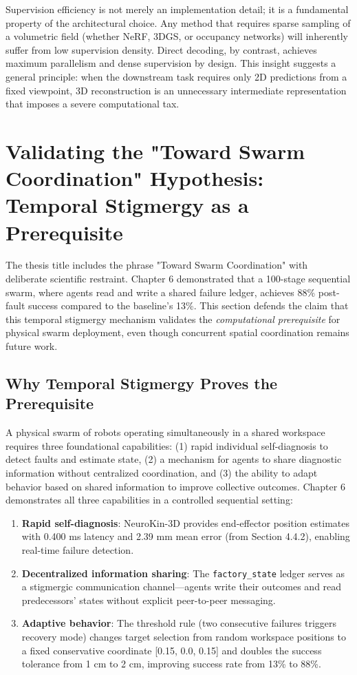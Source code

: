 ﻿\documentclass[12pt,a4paper,oneside]{report}
\begin{document}
Supervision efficiency is not merely an implementation detail; it is a fundamental property of the architectural choice. Any method that requires sparse sampling of a volumetric field (whether NeRF, 3DGS, or occupancy networks) will inherently suffer from low supervision density. Direct decoding, by contrast, achieves maximum parallelism and dense supervision by design. This insight suggests a general principle: when the downstream task requires only 2D predictions from a fixed viewpoint, 3D reconstruction is an unnecessary intermediate representation that imposes a severe computational tax.

\section{Validating the "Toward Swarm Coordination" Hypothesis: Temporal Stigmergy as a Prerequisite}

The thesis title includes the phrase "Toward Swarm Coordination" with deliberate scientific restraint. Chapter 6 demonstrated that a 100-stage sequential swarm, where agents read and write a shared failure ledger, achieves 88\% post-fault success compared to the baseline's 13\%. This section defends the claim that this temporal stigmergy mechanism validates the \textit{computational prerequisite} for physical swarm deployment, even though concurrent spatial coordination remains future work.

\subsection{Why Temporal Stigmergy Proves the Prerequisite}

A physical swarm of robots operating simultaneously in a shared workspace requires three foundational capabilities: (1) rapid individual self-diagnosis to detect faults and estimate state, (2) a mechanism for agents to share diagnostic information without centralized coordination, and (3) the ability to adapt behavior based on shared information to improve collective outcomes. Chapter 6 demonstrates all three capabilities in a controlled sequential setting:

\begin{enumerate}
    \item \textbf{Rapid self-diagnosis}: NeuroKin-3D provides end-effector position estimates with 0.400 ms latency and 2.39 mm mean error (from Section 4.4.2), enabling real-time failure detection.
    \item \textbf{Decentralized information sharing}: The \texttt{factory\_state} ledger serves as a stigmergic communication channel---agents write their outcomes and read predecessors' states without explicit peer-to-peer messaging.
    \item \textbf{Adaptive behavior}: The threshold rule (two consecutive failures triggers recovery mode) changes target selection from random workspace positions to a fixed conservative coordinate [0.15, 0.0, 0.15] and doubles the success tolerance from 1 cm to 2 cm, improving success rate from 13\% to 88\%.
\end{enumerate}
\end{document}
